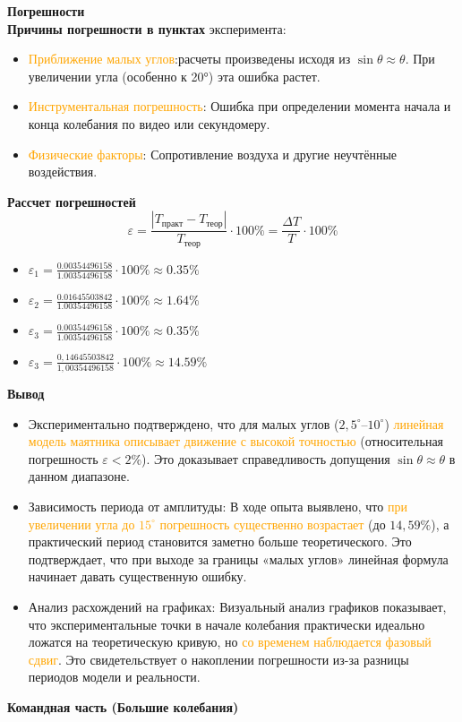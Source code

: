 \documentclass[aspectratio=169]{beamer}
\begin{document}
	\large \textbf{\textcolor{structure.fg}{Погрешности}}\\
	\textbf{Причины погрешности в пунктах }эксперимента:
	\begin{itemize}
	\item \textcolor{orange}{Приближение малых углов}:расчеты произведены исходя из $\sin \theta \approx \theta$. При увеличении угла (особенно к 20°) эта ошибка растет.
	\item \textcolor{orange}{Инструментальная погрешность}: Ошибка при определении момента начала и конца колебания по видео или секундомеру.
	\item \textcolor{orange}{Физические факторы}: Сопротивление воздуха и другие неучтённые воздействия.
	\end{itemize}
	\newpage
	\textbf{Рассчет погрешностей}
	\[
	\boxed{\varepsilon = \frac{|T_{\text{практ}} - T_{\text{теор}}|}{T_{\text{теор}}} \cdot 100\% = \frac{\Delta T}{T}\cdot 100\%} \]
	\begin{itemize}
	\item\(
	\varepsilon_1 = \frac{0.00354496158}{1.00354496158} \cdot 100\% \approx 0.35\% 
	\)
	\item\(
	\varepsilon_2 = \frac{0.01645503842}{1.00354496158} \cdot 100\% \approx 1.64\% 
	\)
	\item\(
	\varepsilon_3 = \frac{0.00354496158}{1.00354496158} \cdot 100\% \approx 0.35\% 
	\)
	\item\(
	\varepsilon_3 = \frac{0,14645503842}{1,00354496158} \cdot 100\% \approx 14.59\% 
	\)
\end{itemize}
	\newpage
	\textbf{Вывод}
	\begin{itemize}
	\item Экспериментально подтверждено, что для малых углов ($2{,}5^\circ$–$10^\circ$) \textcolor{orange}{линейная модель маятника описывает движение с высокой точностью} (относительная погрешность $\varepsilon < 2\%$). Это доказывает справедливость допущения $\sin \theta \approx \theta$ в данном диапазоне.
	\item Зависимость периода от амплитуды: В ходе опыта выявлено, что \textcolor{orange}{при увеличении угла до $15^\circ$ погрешность существенно возрастает} (до $14{,}59\%$), а практический период становится заметно больше теоретического. Это подтверждает, что при выходе за границы «малых углов» линейная формула начинает давать существенную ошибку.
	\item Анализ расхождений на графиках: Визуальный анализ графиков показывает, что экспериментальные точки в начале колебания практически идеально ложатся на теоретическую кривую, но \textcolor{orange}{со временем наблюдается фазовый сдвиг}. Это свидетельствует о накоплении погрешности из-за разницы периодов модели и реальности.
	\end{itemize}
	\newpage
	\large \textbf{\textcolor{structure.fg}{Командная часть (Большие колебания)}}\\
	
\end{document}
